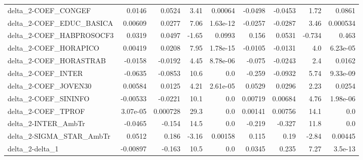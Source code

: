 \begin{tabular}{lrrrrrrrr}
delta\_2-COEF\_CONGEF               &      0.0146 &       0.0524 &    3.41 &  0.00064 &    -0.0498 &     -0.0453 &         1.72 &        0.0861 \\
delta\_2-COEF\_EDUC\_BASICA          &     0.00609 &       0.0277 &    7.06 & 1.63e-12 &    -0.0257 &     -0.0287 &         3.46 &      0.000534 \\
delta\_2-COEF\_HABPROSOCF3          &      0.0319 &       0.0497 &   -1.65 &   0.0993 &      0.156 &      0.0531 &       -0.734 &         0.463 \\
delta\_2-COEF\_HORAPICO             &     0.00419 &       0.0208 &    7.95 & 1.78e-15 &    -0.0105 &     -0.0131 &          4.0 &      6.23e-05 \\
delta\_2-COEF\_HORASTRAB            &     -0.0158 &      -0.0192 &    4.45 & 8.78e-06 &     -0.075 &     -0.0243 &          2.4 &        0.0162 \\
delta\_2-COEF\_INTER                &     -0.0635 &      -0.0853 &    10.6 &      0.0 &     -0.259 &     -0.0932 &         5.74 &      9.33e-09 \\
delta\_2-COEF\_JOVEN30              &     0.00584 &       0.0125 &    4.21 & 2.61e-05 &     0.0529 &      0.0296 &         2.23 &        0.0254 \\
delta\_2-COEF\_SININFO              &    -0.00533 &      -0.0221 &    10.1 &      0.0 &    0.00719 &     0.00684 &         4.76 &      1.98e-06 \\
delta\_2-COEF\_TPROF                &    3.07e-05 &     0.000728 &    29.3 &      0.0 &    0.00141 &     0.00756 &         14.1 &           0.0 \\
delta\_2-INTER\_AmbTr               &     -0.0465 &       -0.154 &    14.5 &      0.0 &     -0.219 &      -0.327 &         11.8 &           0.0 \\
delta\_2-SIGMA\_STAR\_AmbTr          &      0.0512 &        0.186 &   -3.16 &  0.00158 &      0.115 &        0.19 &        -2.84 &       0.00445 \\
delta\_2-delta\_1                   &    -0.00897 &       -0.163 &    10.5 &      0.0 &     0.0345 &       0.235 &         7.27 &       3.5e-13 \\
\bottomrule
\end{tabular}
